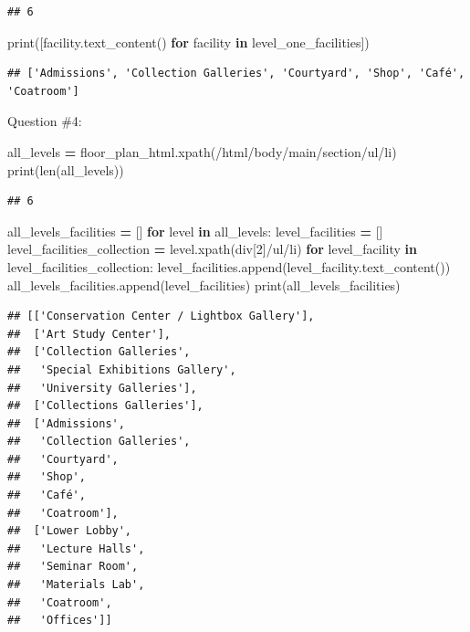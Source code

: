 \documentclass[
]{book}
\newenvironment{Shaded}{\begin{snugshade}}{\end{snugshade}}
\newcommand{\BuiltInTok}[1]{#1}
\newcommand{\ControlFlowTok}[1]{\textcolor[rgb]{0.13,0.29,0.53}{\textbf{#1}}}
\newcommand{\KeywordTok}[1]{\textcolor[rgb]{0.13,0.29,0.53}{\textbf{#1}}}
\newcommand{\NormalTok}[1]{#1}
\newcommand{\OperatorTok}[1]{\textcolor[rgb]{0.81,0.36,0.00}{\textbf{#1}}}
\newcommand{\StringTok}[1]{\textcolor[rgb]{0.31,0.60,0.02}{#1}}
\begin{document}
\begin{alert}
\begin{verbatim}
## 6
\end{verbatim}

\begin{Shaded}
\begin{Highlighting}[]
\BuiltInTok{print}\NormalTok{([facility.text\_content() }\ControlFlowTok{for}\NormalTok{ facility }\KeywordTok{in}\NormalTok{ level\_one\_facilities])}
\end{Highlighting}
\end{Shaded}

\begin{verbatim}
## ['Admissions', 'Collection Galleries', 'Courtyard', 'Shop', 'Café', 'Coatroom']
\end{verbatim}

Question \#4:

\begin{Shaded}
\begin{Highlighting}[]
\NormalTok{all\_levels }\OperatorTok{=}\NormalTok{ floor\_plan\_html.xpath(}\StringTok{\textquotesingle{}/html/body/main/section/ul/li\textquotesingle{}}\NormalTok{)}
\BuiltInTok{print}\NormalTok{(}\BuiltInTok{len}\NormalTok{(all\_levels))}
\end{Highlighting}
\end{Shaded}

\begin{verbatim}
## 6
\end{verbatim}

\begin{Shaded}
\begin{Highlighting}[]
\NormalTok{all\_levels\_facilities }\OperatorTok{=}\NormalTok{ []}
\ControlFlowTok{for}\NormalTok{ level }\KeywordTok{in}\NormalTok{ all\_levels:}
\NormalTok{    level\_facilities }\OperatorTok{=}\NormalTok{ []}
\NormalTok{    level\_facilities\_collection }\OperatorTok{=}\NormalTok{ level.xpath(}\StringTok{\textquotesingle{}div[2]/ul/li\textquotesingle{}}\NormalTok{)}
    \ControlFlowTok{for}\NormalTok{ level\_facility }\KeywordTok{in}\NormalTok{ level\_facilities\_collection:}
\NormalTok{        level\_facilities.append(level\_facility.text\_content())}
\NormalTok{    all\_levels\_facilities.append(level\_facilities)}
\BuiltInTok{print}\NormalTok{(all\_levels\_facilities)}
\end{Highlighting}
\end{Shaded}

\begin{verbatim}
## [['Conservation Center / Lightbox Gallery'],
##  ['Art Study Center'],
##  ['Collection Galleries',
##   'Special Exhibitions Gallery',
##   'University Galleries'],
##  ['Collections Galleries'],
##  ['Admissions',
##   'Collection Galleries',
##   'Courtyard',
##   'Shop',
##   'Café',
##   'Coatroom'],
##  ['Lower Lobby',
##   'Lecture Halls',
##   'Seminar Room',
##   'Materials Lab',
##   'Coatroom',
##   'Offices']]
\end{verbatim}

\end{alert}
\end{document}
